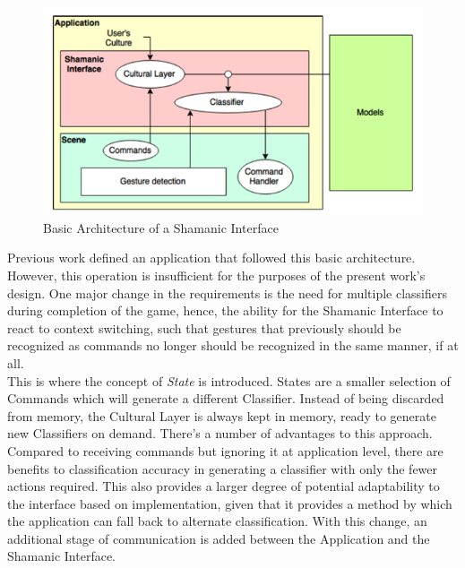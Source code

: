     \begin{figure}[ht]
        \centering
        \includegraphics{figures/ShamanicBasicArchitecture.png}
        \caption{\label{fig:ShamanicBasicArchitecture}Basic Architecture of a Shamanic Interface}
    \end{figure}
    
    Previous work defined an application that followed this basic architecture. However, this operation is insufficient for the purposes of the present work’s design. One major change in the requirements is the need for multiple classifiers during completion of the game, hence, the ability for the Shamanic Interface to react to context switching, such that gestures that previously should be recognized as commands no longer should be recognized in the same manner, if at all.\\
    This is where the concept of \emph{State} is introduced. States are a smaller selection of Commands which will generate a different Classifier. Instead of being discarded from memory, the Cultural Layer is always kept in memory, ready to generate new Classifiers on demand. There’s a number of advantages to this approach. Compared to receiving commands but ignoring it at application level, there are benefits to classification accuracy in generating a classifier with only the fewer actions required. This also provides a larger degree of potential adaptability to the interface based on implementation, given that it provides a method by which the application can fall back to alternate classification. With this change, an additional stage of communication is added between the Application and the Shamanic Interface.\\
    
